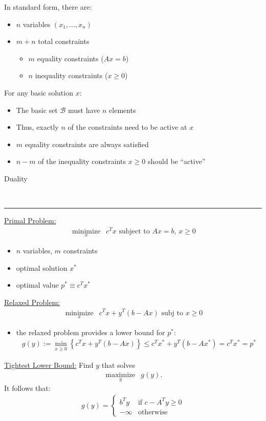 \documentclass{article}
\newcommand{\header}[1]{\begin{large}\noindent #1\end{large}\\\rule{\textwidth}{0.5pt}}
\newcommand{\sheader}[1]{\underline{#1:}}
\newcommand{\curly}[1]{\left\{#1\right\}}
\newcommand{\oper}[2]{\underset{#2}{\operatorname{#1}}}
\begin{document}
In standard form, there are:
\begin{itemize}
    \item $n$ variables $(x_1, \ldots, x_n)$
    \item $m + n$ total constraints
    \begin{itemize}
        \item $m$ equality constraints ($Ax = b$)
        \item $n$ inequality constraints ($x\geq 0$)
    \end{itemize}
\end{itemize}
For any basic solution $x$:
\begin{itemize}
    \item The basic set $\mathcal{B}$ must have $n$ elements
    \item Thus, exactly $n$ of the constraints need to be active at $x$
    \item $m$ equality constraints are always satisfied
    \item $n-m$ of the inequality constraints $x\geq 0$ should be ``active''
\end{itemize}

\header{Duality}
\sheader{Primal Problem}
\begin{align*}
    \oper{minimize}{x}\,\,\, c^Tx \textrm{  subject to  } Ax = b, \, x\geq 0
\end{align*}
\begin{itemize}
    \item $n$ variables, $m$ constraints
    \item optimal solution $x^*$
    \item optimal value $p^* \equiv c^T x^*$
\end{itemize}

\sheader{Relaxed Problem}
\begin{align*}
    \oper{minimize}{x}\,\,\, c^Tx + y^T(b-Ax) \textrm{  subj to  } x\geq 0
\end{align*}
\begin{itemize}
    \item the relaxed problem provides a lower bound for $p^*$:
    \begin{align*}
        g(y) := \min_{x\geq 0}\curly{c^T x + y^T(b-Ax)} \leq c^T x^* + y^T(b-Ax^*) = c^Tx^* = p^*
    \end{align*}
\end{itemize}
\sheader{Tightest Lower Bound} Find $y$ that solves
\begin{align*}
    \oper{maximize}{y}\,\,\, g(y).
\end{align*}
It follows that:
\begin{align*}
    g(y) = \begin{cases}
        b^Ty & \textrm{if } c - A^Ty \geq 0\\
        -\infty & \textrm{otherwise}
    \end{cases}
\end{align*}
\end{document}

